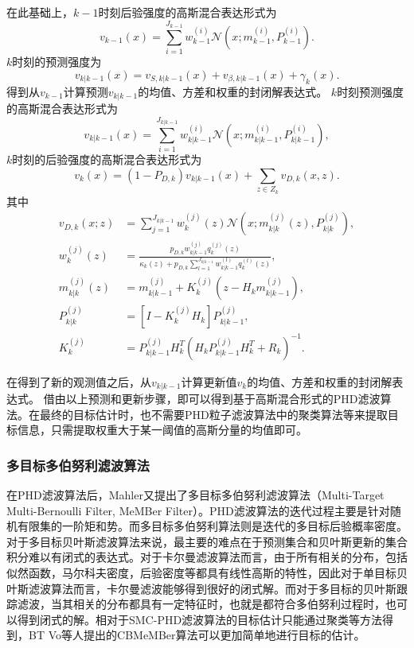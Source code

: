 在此基础上，$k-1$时刻后验强度的高斯混合表达形式为
\begin{equation}
v_{k-1}(x) = \sum_{i=1}^{J_{k-1}}w_{k-1}^{(i)}\mathcal N(x;m_{k-1}^{(i)},P_{k-1}^{(i)}).
\end{equation}
$k$时刻的预测强度为
\begin{equation}
v_{k|k-1}(x) = v_{S,k|k-1}(x) +v_{\beta,k|k-1}(x)+ \gamma_k(x).
\end{equation}
得到从$v_{k-1}$计算预测$v_{k|k-1}$的均值、方差和权重的封闭解表达式。
$k$时刻预测强度的高斯混合表达形式为
\begin{equation}
v_{k|k-1}(x) = \sum_{i=1}^{J_{k|k-1}}w_{k|k-1}^{(i)}\mathcal N(x;m_{k|k-1}^{(i)},P_{k|k-1}^{(i)}),
\end{equation}
$k$时刻的后验强度的高斯混合表达形式为
\begin{equation}
v_k(x) = (1-P_{D,k})v_{k|k-1}(x) + \sum_{z\in Z_k}v_{D,k}(x,z).
\end{equation}
其中
\begin{align}
v_{D,k}(x;z) &= \sum_{j=1}^{J_{k|k-1}}w_{k}^{(j)}(z)\mathcal N(x;m_{k|k}^{(j)}(z),P_{k|k}^{(j)}),\\
w_k^{(j)}(z) &= \frac{p_{D,k}w_{k|k-1}^{(j)}q_k^{(j)}(z)}{\kappa_k(z)+p_{D,k}\sum_{l=1}^{J_{k|k-1}}w_{k|k-1}^{(l)}q_k^{(l)}(z)},\\
m_{k|k}^{(j)}(z) &= m_{k|k-1}^{(j)} + K_k^{(j)}(z- H_km_{k|k-1}^{(j)}),\\
P_{k|k}^{(j)} &= [I - K_k^{(j)}H_k]P_{k|k-1}^{(j)},\\
K_k^{(j)} &= P_{k|k-1}^{(j)}H_k^T(H_kP_{k|k-1}^{(j)}H_k^T+R_k)^{-1}.
\end{align}

在得到了新的观测值之后，从$v_{k|k-1}$计算更新值$v_{k}$的均值、方差和权重的封闭解表达式。
借由以上预测和更新步骤，即可以得到基于高斯混合形式的PHD滤波算法。在最终的目标估计时，也不需要PHD粒子滤波算法中的聚类算法等来提取目标信息，只需提取权重大于某一阈值的高斯分量的均值即可。

\subsubsection{多目标多伯努利滤波算法}

在PHD滤波算法后，Mahler又提出了多目标多伯努利滤波算法（Multi-Target Multi-Bernoulli Filter, MeMBer Filter）\cite{mahler2007statistical}。PHD滤波算法的迭代过程主要是针对随机有限集的一阶矩和势。而多目标多伯努利算法则是迭代的多目标后验概率密度。对于多目标贝叶斯滤波算法来说，最主要的难点在于预测集合和贝叶斯更新的集合积分难以有闭式的表达式。对于卡尔曼滤波算法而言，由于所有相关的分布，包括似然函数，马尔科夫密度，后验密度等都具有线性高斯的特性，因此对于单目标贝叶斯滤波算法而言，卡尔曼滤波能够得到很好的闭式解。而对于多目标的贝叶斯跟踪滤波，当其相关的分布都具有一定特征时，也就是都符合多伯努利过程时，也可以得到闭式的解。相对于SMC-PHD滤波算法的目标估计只能通过聚类等方法得到，BT Vo等人提出的CBMeMBer\cite{vo2009cardinality}算法可以更加简单地进行目标的估计。

